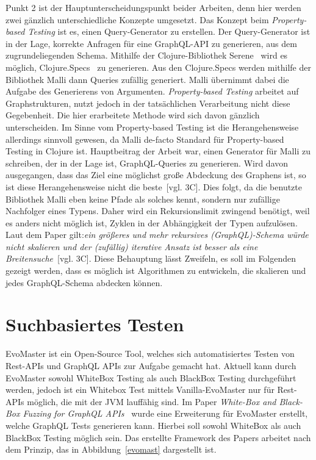 Punkt 2 ist der Hauptunterscheidungspunkt beider Arbeiten, denn hier werden zwei gänzlich unterschiedliche Konzepte umgesetzt.
Das Konzept beim \textit{Property-based Testing} ist es, einen Query-Generator zu erstellen.
Der Query-Generator ist in der Lage, korrekte Anfragen für eine GraphQL-API zu generieren, aus dem zugrundeliegenden Schema.
Mithilfe der Clojure-Bibliothek Serene~\cite{clojureserene} wird es möglich, Clojure.Specs~\cite{clojurespec} zu generieren.
Aus den Clojure.Specs werden mithilfe der Bibliothek Malli\cite{clojuremalli} dann Queries zufällig generiert.
Malli übernimmt dabei die Aufgabe des Generierens von Argumenten.
\textit{Property-based Testing} arbeitet auf Graphstrukturen, nutzt jedoch in der tatsächlichen Verarbeitung nicht diese Gegebenheit.
Die hier erarbeitete Methode wird sich davon gänzlich unterscheiden.
Im Sinne vom Property-based Testing ist die Herangehensweise allerdings sinnvoll gewesen, da Malli\cite{clojuremalli} de-facto Standard für Property-based Testing in Clojure ist.
Hauptbeitrag der Arbeit war, einen Generator für Malli zu schreiben, der in der Lage ist, GraphQL-Queries zu generieren.
Wird davon ausgegangen, dass das Ziel eine möglichst große Abdeckung des Graphens ist, so ist diese Herangehensweise nicht die beste~\cite{property-based-testing}[vgl. 3C].
Dies folgt, da die benutzte Bibliothek Malli eben keine Pfade als solches kennt, sondern nur zufällige Nachfolger eines Typens.
Daher wird ein Rekursionslimit zwingend benötigt, weil es anders nicht möglich ist, Zyklen in der Abhängigkeit der Typen aufzulösen.
Laut dem Paper gilt:\textit{ein größeres und mehr rekursives (GraphQL)-Schema würde nicht skalieren und der (zufällig) iterative Ansatz ist besser als eine Breitensuche}~\cite{property-based-testing}[vgl. 3C].
Diese Behauptung lässt Zweifeln, es soll im Folgenden gezeigt werden, dass es möglich ist Algorithmen zu entwickeln, die skalieren und jedes GraphQL-Schema abdecken können.

\section{Suchbasiertes Testen}

EvoMaster\cite{evo-master} ist ein Open-Source Tool, welches sich automatisiertes Testen von Rest-APIs und GraphQL APIs zur Aufgabe gemacht hat.
Aktuell kann durch EvoMaster sowohl WhiteBox Testing als auch BlackBox Testing durchgeführt werden, jedoch ist ein
Whitebox Test mittels Vanilla-EvoMaster nur für Rest-APIs möglich, die mit der JVM lauffähig sind.
Im Paper \textit{White-Box and Black-Box Fuzzing for GraphQL APIs}~\cite{belhadi2022whitebox} wurde eine Erweiterung für EvoMaster
erstellt, welche GraphQL Tests generieren kann.
Hierbei soll sowohl WhiteBox als auch BlackBox Testing möglich sein.
Das erstellte Framework des Papers arbeitet nach dem Prinzip, das in Abbildung~\ref{evomast} dargestellt ist.

